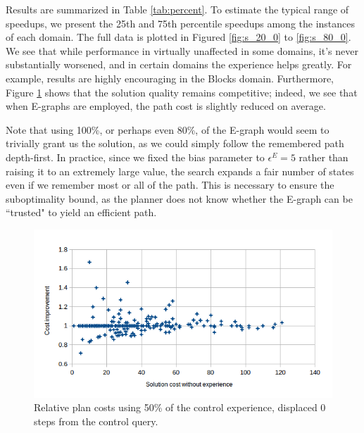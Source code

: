 \documentclass[letterpaper]{article}
\begin{document}
Results are summarized in Table \ref{tab:percent}.
To estimate the typical range of speedups, we present the 25th and 75th percentile speedups among the instances of each domain.
The full data is plotted in Figured \ref{fig:s_20_0} to \ref{fig:s_80_0}.
We see that while performance in virtually unaffected in some domains, it's never substantially worsened, and in certain domains the experience helps greatly.
For example, results are highly encouraging in the Blocks domain.
Furthermore, Figure \ref{fig:c_50_0} shows that the solution quality remains competitive; indeed, we see that when E-graphs are employed, the path cost is slightly reduced on average.

Note that using 100\%, or perhaps even 80\%, of the E-graph would seem to trivially grant us the solution, as we could simply follow the remembered path depth-first.
In practice, since we fixed the bias parameter to $\epsilon^E=5$ rather than raising it to an extremely large value, the search expands a fair number of states even if we remember most or all of the path.
This is necessary to ensure the suboptimality bound, as the planner does not know whether the E-graph can be ``trusted" to yield an efficient path.

\begin{figure}
	\centering
	\includegraphics[scale=0.5]{Cost_50_0.png}
	\caption{Relative plan costs using 50\% of the control experience, displaced 0 steps from the control query.}
	 \label{fig:c_50_0}
\end{figure}
\end{document}
